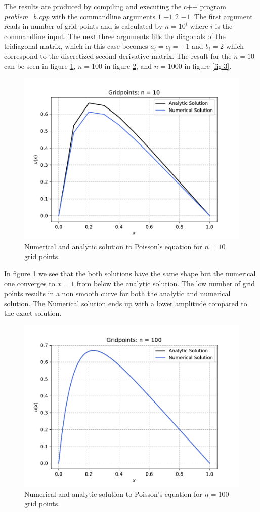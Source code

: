 \documentclass[a4paper,10pt]{article}
\begin{document}
The results are produced by compiling and executing the c++ program \textit{problem\_b.cpp} with the commandline arguments $1$ $-1$ $2$ $-1$. The first argument reads in number of grid points and is calculated by $n = 10^i$ where $i$ is the commandline input. The next three arguments fills the diagonals of the tridiagonal matrix, which in this case becomes $a_i = c_i  = -1$ and $b_i = 2$ which correspond to the discretized second derivative matrix. The result for the $n= 10$ can be seen in figure \ref{fig:1}, $n = 100$ in figure \ref{fig:2}, and $n=1000$ in figure \ref{fig:3}.

\begin{figure}[h]
  \centering
  \includegraphics[width=0.9\linewidth]{figures/fig_10_b.pdf}
  \caption{Numerical and analytic solution to Poisson's equation for $n = 10$ grid points. }
  \label{fig:1}
\end{figure}

In figure \ref{fig:1} we see that the both solutions have the same shape but the numerical one converges to $x=1$ from below the analytic solution. The low number of grid points results in a non smooth curve for both the analytic and numerical solution. The Numerical solution ends up with a lower amplitude compared to the exact solution.

\begin{figure}[h]
  \centering
  \includegraphics[width=0.9\linewidth]{figures/fig_100_b.pdf}
  \caption{Numerical and analytic solution to Poisson's equation for $n = 100$ grid points.}
  \label{fig:2}
\end{figure}
\end{document}
